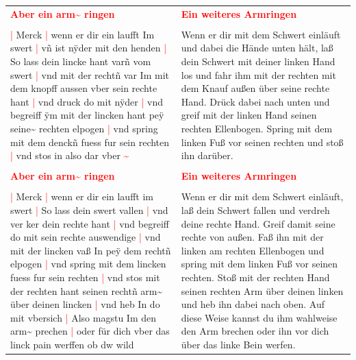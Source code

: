 \begin{longtable}{p{6.25cm}p{6.25cm}}
    \textbf{\textcolor{red}{
        Aber ein arm\textasciitilde{} ringen}}
    &
    \textbf{\textcolor{red}{
        Ein weiteres Armringen}}
    \\
    \\
    \textcolor{red}{|} Merck
    \textcolor{red}{|} wenn er dir ein laufft Im swert
    \textcolor{red}{|} vñ ist nÿder mit den henden
    \textcolor{red}{|} So lass dein lincke hant varñ vom swert
    \textcolor{red}{|} vnd mit der rechtñ var Im mit dem knopff aussen vber sein rechte hant
    \textcolor{red}{|} vnd druck do mit nÿder
    \textcolor{red}{|} vnd begreiff ÿm mit der lincken hant peÿ seine\textasciitilde{} rechten elpogen
    \textcolor{red}{|} vnd spring mit dem denckñ fuess fur sein rechten
    \textcolor{red}{|} vnd stos in also dar vber \textcolor{red}{\textasciitilde{}}
    &
    Wenn er dir mit dem Schwert einläuft und dabei die Hände unten hält, laß dein Schwert mit deiner linken Hand los und fahr ihm mit der rechten mit dem Knauf außen über seine rechte Hand.
    Drück dabei nach unten und greif mit der linken Hand seinen rechten Ellenbogen.
    Spring mit dem linken Fuß vor seinen rechten und stoß ihn darüber.
    \\
    \\
    \textbf{\textcolor{red}{
        Aber ein arm\textasciitilde{} ringen}}
    &
    \textbf{\textcolor{red}{
        Ein weiteres Armringen}}
    \\
    \\
    \textcolor{red}{|} Merck
    \textcolor{red}{|} wenn er dir ein laufft im swert
    \textcolor{red}{|} So lass dein swert vallen
    \textcolor{red}{|} vnd ver ker dein rechte hant
    \textcolor{red}{|} vnd begreiff do mit sein rechte auswendige
    \textcolor{red}{|} vnd mit der lincken vaß In peÿ dem rechtñ elpogen
    \textcolor{red}{|} vnd spring mit dem lincken fuess fur sein rechten
    \textcolor{red}{|} vnd stos mit der rechten hant seinen rechtñ arm\textasciitilde{} über deinen lincken
    \textcolor{red}{|} vnd heb In do mit vbersich
    \textcolor{red}{|} Also magstu Im den arm\textasciitilde{} prechen
    \textcolor{red}{|} oder für dich vber das linck pain werffen ob dw wild
    &
    Wenn er dir mit dem Schwert einläuft, laß dein Schwert fallen und verdreh deine rechte Hand.
    Greif damit seine rechte von außen.
    Faß ihn mit der linken am rechten Ellenbogen und spring mit dem linken Fuß vor seinen rechten.
    Stoß mit der rechten Hand seinen rechten Arm über deinen linken und heb ihn dabei nach oben.
    Auf diese Weise kannst du ihm wahlweise den Arm brechen oder ihn vor dich über das linke Bein werfen.
\end{longtable}

